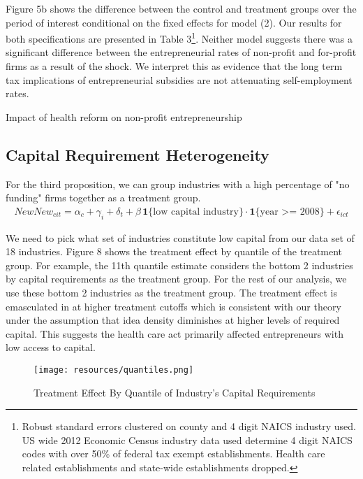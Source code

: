 \documentclass[12pt]{article}
\begin{document}
Figure 5b shows the difference between the control and treatment groups over the period of interest conditional on the fixed effects for model (2). Our results for both specifications are presented in Table 3\footnote{Robust standard errors clustered on county and 4 digit NAICS industry used. US wide 2012 Economic Census industry data used determine 4 digit NAICS codes with over 50\% of federal tax exempt establishments. Health care related establishments and state-wide establishments dropped.}. Neither model suggests there was a significant difference between the entrepreneurial rates of non-profit and for-profit firms as a result of the shock. We interpret this as evidence that the long term tax implications of entrepreneurial subsidies are not attenuating self-employment rates. 
\begin{center}
	\begin{table}[H]
		\centering
		
		\caption{Impact of health reform on non-profit entrepreneurship}
	\end{table}
\end{center}

\subsection{Capital Requirement Heterogeneity}

For the third proposition, we can group industries with a high percentage of "no funding" firms together as a treatment group. 
\begin{align}
NewNew_{cit} =  \alpha_c + \gamma_i+ \delta_t + \beta \, \mathbf{1}\{\text{low capital industry}\} \cdot \mathbf{1}\{\text{year >= 2008}\} + \epsilon_{ict}
\end{align}

We need to pick what set of industries constitute low capital from our data set of 18 industries. Figure 8 shows the treatment effect by quantile of the treatment group. For example, the 11th quantile estimate considers the bottom 2 industries by capital requirements as the treatment group. For the rest of our analysis, we use these bottom 2 industries as the treatment group. The treatment effect is emasculated in at higher treatment cutoffs which is consistent with our theory under the assumption that idea density diminishes at higher levels of required capital. This suggests the health care act primarily affected entrepreneurs with low access to capital. 

\begin{figure}[H]
	\centering
	\texttt{[image: resources/quantiles.png]}
	\caption{Treatment Effect By Quantile of Industry's Capital Requirements}
\end{figure}
\end{document}
